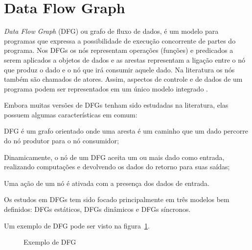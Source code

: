 
\section{Data Flow Graph}

\textit{Data Flow Graph} (DFG) ou grafo de fluxo de dados, é um modelo para 
programas que expressa a possibilidade de execução concorrente de partes do
programa. 
Nos DFGs os nós representam operações (funções) e predicados a serem
aplicados a objetos de dados e as arestas representam a ligação entre o nó que
produz o dado e o nó que irá consumir aquele dado.
Na literatura os nós também são chamados de atores.
Assim, aspectos de controle e de dados de um programa podem ser representados 
em um único modelo integrado \cite{eopc}.

Embora muitas versões de DFGs tenham sido estudadas na literatura, elas possuem 
algumas características em comum:

\begin{alineas}
        \item DFG é um grafo orientado onde uma aresta é um caminho que um dado
        percorre do nó produtor para o nó consumidor;
        \item Dinamicamente, o nó de um DFG aceita um ou mais dado como entrada,
        realizando computações e devolvendo os dados do retorno para suas
        saídas;
        \item Uma ação de um nó é ativada com a presença dos dados de entrada.
\end{alineas}

Os estudos em DFGs tem sido focado principalmente em três modelos bem definidos:
DFGs estáticos, DFGs dinâmicos e DFGs síncronos.

Um exemplo de DFG pode ser visto na figura~\ref{dfg_ex}.

\begin{figure}[h]
\centering
\label{dfg_ex}
\caption{Exemplo de DFG}
\end{figure}




